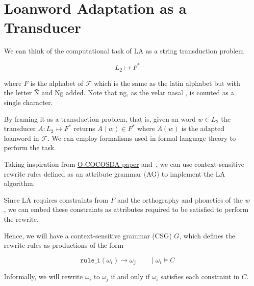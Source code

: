 \section{Loanword Adaptation as a Transducer}

We can think of the computational task of LA as a string transduction
problem

\[
    L_2 \mapsto F^*
\]

where \( F \) is the alphabet of \( \mathcal{F} \) which is the same as
the latin alphabet but with the letter \~N and Ng added. Note that ng, 
as the velar nasal , is counted as a single character.

By framing it as a transduction problem, that is, given an word \( w \in L_2 \)
the transducer \( A: L_2 \mapsto F^* \) returns \( A(w) \in F^* \)
where \( A(w) \) is the adapted loanword in \( \mathcal{F} \). We can
employ formalisms used in formal language theory to perform the task.

Taking inspiration from \underline{O-COCOSDA paper} and~\cite{Mao_Hulden_2016},
we can use context-sensitive rewrite rules defined as an attribute grammar 
(AG) to implement the LA algorithm.

Since LA requires constraints from \( F \) and the
orthography and phonetics of the \( w \), we can embed these
constraints as attributes required to be satisfied to perform the rewrite.

Hence, we will have a context-sensitive grammar (CSG) \( G \), which defines
the rewrite-rules as productions of the form

\[
    \texttt{rule\_i}(\omega_i) \to 
    \omega_{j} 
    \qquad 
    \mid \omega_i \vDash C
\]

Informally, we will rewrite \( \omega_i \) to \( \omega_j \) if and only if
\( \omega_i \) satisfies each constraint in \( C \).